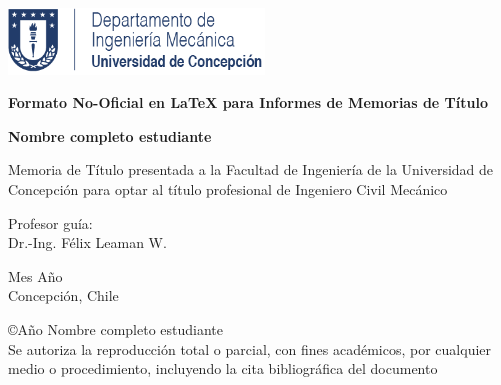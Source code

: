 	
\begin{center}
	
\includegraphics[height=50pt]{udec-dim.png}
\vspace{5cm}


{\Large
\textbf{Formato No-Oficial en \LaTeX{} para Informes de Memorias de Título \\}
}
\vspace{2.5cm}

{\large
\textbf{Nombre completo estudiante\\}
}
\vspace{2.5cm}

{\normalsize
Memoria de Título presentada a la Facultad de Ingeniería de la Universidad de Concepción para optar al título profesional de Ingeniero Civil Mecánico\\
}
\vspace{2.5cm}


{\normalsize
Profesor guía:\\
Dr.-Ing. Félix Leaman W.
}
\vspace{0.5cm}

{\normalsize
Mes Año\\
Concepción, Chile
}
\vspace*{\fill}




\end{center}

{\footnotesize
\copyright Año Nombre completo estudiante\\
Se autoriza la reproducción total o parcial, con fines académicos, por cualquier medio o procedimiento, incluyendo la cita bibliográfica del documento
}
\vspace{0.5cm}

